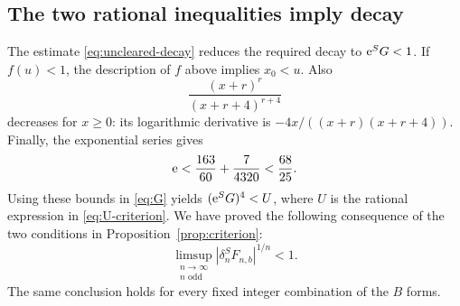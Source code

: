\subsection{The two rational inequalities imply decay}

The estimate \eqref{eq:uncleared-decay} reduces the required
decay to $\mathrm e^S G<1$.
If $f(u)<1$, the description of $f$ above implies $x_0<u$.
Also
\[
 \frac{(x+r)^r}{(x+r+4)^{r+4}}
\]
decreases for $x\ge0$: its logarithmic derivative is
$-4x/((x+r)(x+r+4))$. Finally, the exponential series gives
\[
 \mathrm e<\frac{163}{60}+\frac7{4320}<\frac{68}{25}.
\]
Using these bounds in \eqref{eq:G} yields
$(\mathrm e^S G)^4<U$, where $U$ is the rational expression in
\eqref{eq:U-criterion}. We have proved the following consequence
of the two conditions in Proposition~\ref{prop:criterion}:
\begin{equation}\label{eq:cleared-decay}
 \limsup_{\substack{n\to\infty\\n\text{ odd}}}
            |\delta_n^S F_{n,b}|^{1/n}<1.
\end{equation}
The same conclusion holds for every fixed integer combination of
the $B$ forms.
